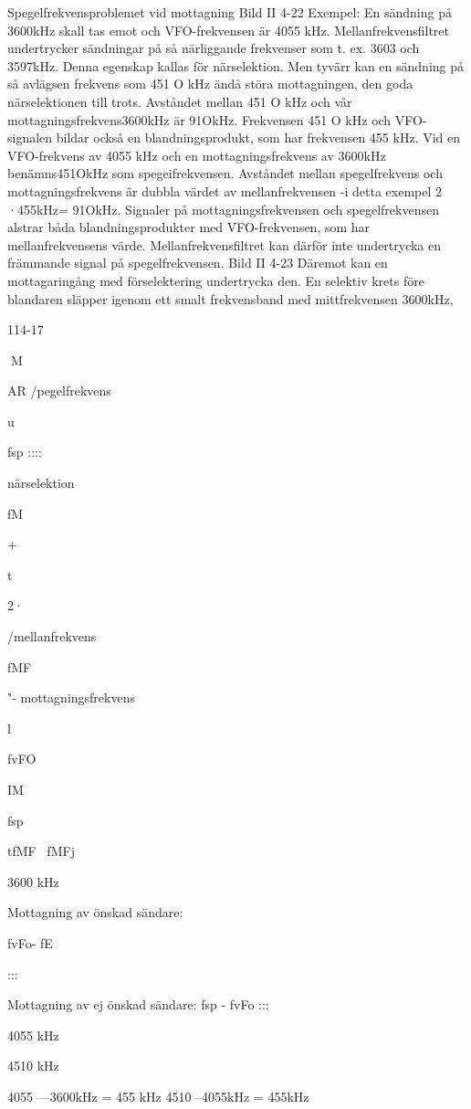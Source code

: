 Spegelfrekvensproblemet vid mottagning
Bild II 4-22
Exempel:
En sändning på 3600kHz skall tas emot och
VFO-frekvensen är 4055 kHz. Mellanfrekvensfiltret undertrycker sändningar på så
närliggande frekvenser som t. ex. 3603 och
3597kHz. Denna egenskap kallas för närselektion.
Men tyvärr kan en sändning på så avlägsen frekvens som 451 O kHz ändå störa
mottagningen, den goda närselektionen till
trots. Avståndet mellan 451 O kHz och vår
mottagningsfrekvens3600kHz är 91OkHz.
Frekvensen 451 O kHz och VFO-signalen
bildar också en blandningsprodukt, som har
frekvensen 455 kHz. Vid en VFO-frekvens
av 4055 kHz och en mottagningsfrekvens
av 3600kHz benämns451OkHz som spegeifrekvensen. Avståndet mellan spegelfrekvens och mottagningsfrekvens är dubbla
värdet av mellanfrekvensen -i detta exempel 2 ·455kHz= 91OkHz.
Signaler på mottagningsfrekvensen och
spegelfrekvensen alstrar båda blandningsprodukter med VFO-frekvensen, som har
mellanfrekvensens värde. Mellanfrekvensfiltret kan därför inte undertrycka en främmande signal på spegelfrekvensen.
Bild II 4-23
Däremot kan en mottagaringång med
förselektering undertrycka den. En selektiv
krets före blandaren släpper igenom ett smalt
frekvensband med mittfrekvensen 3600kHz,

114-17

M

AR
/pegelfrekvens

u

fsp ::::

närselektion

fM

+

t

2·

/mellanfrekvens

fMF

"- mottagningsfrekvens

l

fvFO

IM

fsp

tfMF ~fMFj

3600
kHz

Mottagning av önskad sändare:

fvFo- fE

:::

Mottagning av ej önskad sändare: fsp - fvFo :::

4055
kHz

4510
kHz

4055 ---3600kHz = 455 kHz
4510 --4055kHz = 455kHz

